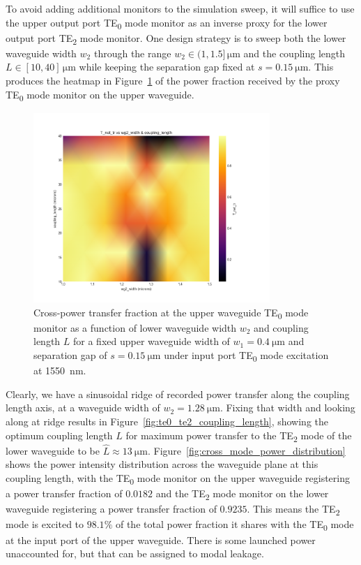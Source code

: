 \documentclass[10pt, a4paper]{article}
\begin{document}
To avoid adding additional monitors to the simulation sweep,
it will suffice to use the upper output port TE\textsubscript{0} mode monitor as an inverse proxy for the lower output port TE\textsubscript{2} mode monitor.
One design strategy is to sweep both the lower waveguide width \(w_2\) through the range \(w_2\in(1,1.5]\,\unit{\um}\) and the coupling length \(L\in[10,40]\,\unit{\um}\) while keeping the separation gap fixed at \(s=\SI{0.15}{\um}\).
This produces the heatmap in Figure~\ref{fig:te0_te2_coupling_heatmap} of the power fraction received by the proxy TE\textsubscript{0} mode monitor on the upper waveguide.
\begin{figure}[h!]
  \centering
  \includegraphics[width=0.8\textwidth]{task3/sweep_plots/sweep_idx_7_sweep__coupling_length=10_40_6_wg1_width=0.4_wg2_width=1_1.5_8_separation=0.15_center_wavelength=1.55_T_net_tr_heatmap.png}
  \caption{Cross-power transfer fraction at the upper waveguide TE\textsubscript{0} mode monitor as a function of lower waveguide width \(w_2\) and coupling length \(L\) for a fixed upper waveguide width of \(w_1=\SI{0.4}{\um}\) and separation gap of \(s=\SI{0.15}{\um}\) under input port TE\textsubscript{0} mode excitation at \SI{1550}{\nm}.}
  \label{fig:te0_te2_coupling_heatmap}
\end{figure}

Clearly, we have a sinusoidal ridge of recorded power transfer
along the coupling length axis,
at a waveguide width of \(w_2=\SI{1.28}{\um}\).
Fixing that width and looking along at ridge results in Figure~\ref{fig:te0_te2_coupling_length}, showing the optimum coupling length \(L\) for maximum power transfer to the TE\textsubscript{2} mode of the lower waveguide 
to be \(\hat{L}\approx\SI{13}{\um}\). Figure~\ref{fig:cross_mode_power_distribution} shows the power intensity distribution across the waveguide plane at this coupling length,
with the TE\textsubscript{0} mode monitor on the upper waveguide registering a power transfer fraction of \(0.0182\) and the TE\textsubscript{2} mode monitor on the lower waveguide registering a power transfer fraction of \(0.9235\). This means the TE\textsubscript{2} mode is excited to \(98.1\%\) of the total power fraction it shares with the TE\textsubscript{0} mode at the input port of the upper waveguide. There is some launched power unaccounted for, but that can be assigned to modal leakage.
\end{document}
